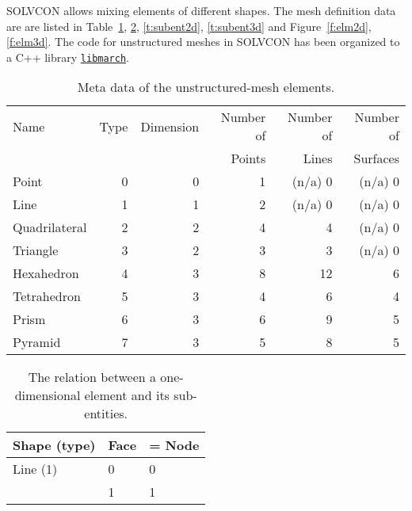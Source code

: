 \documentclass[11pt,dvips]{article}
\newcommand{\topcaption}{%
\setlength{\abovecaptionskip}{0pt}%
\setlength{\belowcaptionskip}{10pt}%
\caption}
\numberwithin{equation}{section}
\begin{document}
SOLVCON allows mixing elements of different shapes.  The mesh definition data
are are listed in Table~\ref{t:elm:meta}, \ref{t:subent1d}, \ref{t:subent2d},
\ref{t:subent3d} and Figure~\ref{f:elm2d}, \ref{f:elm3d}.  The code for
unstructured meshes in SOLVCON has been organized to a C++ library
\href{https://github.com/solvcon/solvcon/tree/master/libmarch}{\texttt{libmarch}}.

%
\begin{table}[h]
\centering

\topcaption{
%
Meta data of the unstructured-mesh elements.
%
}

\label{t:elm:meta}
\begin{tabular}{lrrrrr}
\toprule
Name          & Type & Dimension & Number of & Number of & Number of \\
              &      &           &    Points &     Lines &  Surfaces \\
\midrule
Point         & 0    & 0         & 1         & (n/a) 0   & (n/a) 0   \\
Line          & 1    & 1         & 2         & (n/a) 0   & (n/a) 0   \\
Quadrilateral & 2    & 2         & 4         & 4         & (n/a) 0   \\
Triangle      & 3    & 2         & 3         & 3         & (n/a) 0   \\
Hexahedron    & 4    & 3         & 8         & 12        & 6         \\
Tetrahedron   & 5    & 3         & 4         & 6         & 4         \\
Prism         & 6    & 3         & 6         & 9         & 5         \\
Pyramid       & 7    & 3         & 5         & 8         & 5         \\
\bottomrule
\end{tabular}
\end{table}
%

%
\begin{table}[h]
\centering

\topcaption{
%
The relation between a one-dimensional element and its sub-entities.
%
}

\label{t:subent1d}
\begin{tabular}{lll}
\toprule
Shape (type) & Face & = Node \\
\midrule
Line (1)     & 0    & 0      \\
             & 1    & 1      \\
\bottomrule
\end{tabular}
\end{table}
%
\end{document}
